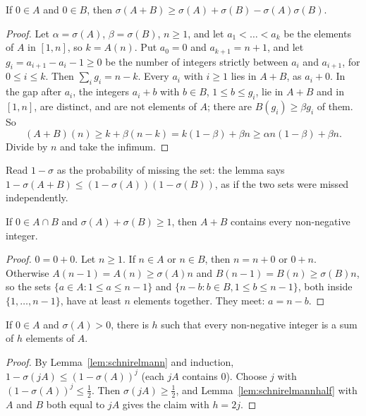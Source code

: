 \begin{lemma}\label{lem:schnirelmann}
If $0\in A$ and $0\in B$, then $\sigma(A+B)\ge\sigma(A)+\sigma(B)-\sigma(A)\sigma(B)$.
\end{lemma}
\begin{proof}
Let $\alpha=\sigma(A)$, $\beta=\sigma(B)$, $n\ge1$, and let $a_1<\dots<a_k$ be the elements of $A$ in $[1,n]$, so $k=A(n)$. Put $a_0=0$ and $a_{k+1}=n+1$, and let $g_i=a_{i+1}-a_i-1\ge0$ be the number of integers strictly between $a_i$ and $a_{i+1}$, for $0\le i\le k$. Then $\sum_ig_i=n-k$. Every $a_i$ with $i\ge1$ lies in $A+B$, as $a_i+0$. In the gap after $a_i$, the integers $a_i+b$ with $b\in B$, $1\le b\le g_i$, lie in $A+B$ and in $[1,n]$, are distinct, and are not elements of $A$; there are $B(g_i)\ge\beta g_i$ of them. So
\[
(A+B)(n)\ge k+\beta(n-k)=k(1-\beta)+\beta n\ge\alpha n(1-\beta)+\beta n.
\]
Divide by $n$ and take the infimum.
\end{proof}

Read $1-\sigma$ as the probability of missing the set: the lemma says $1-\sigma(A+B)\le(1-\sigma(A))(1-\sigma(B))$, as if the two sets were missed independently.

\begin{lemma}\label{lem:schnirelmannhalf}
If $0\in A\cap B$ and $\sigma(A)+\sigma(B)\ge1$, then $A+B$ contains every non-negative integer.
\end{lemma}
\begin{proof}
$0=0+0$. Let $n\ge1$. If $n\in A$ or $n\in B$, then $n=n+0$ or $0+n$. Otherwise $A(n-1)=A(n)\ge\sigma(A)n$ and $B(n-1)=B(n)\ge\sigma(B)n$, so the sets $\{a\in A:1\le a\le n-1\}$ and $\{n-b:b\in B,1\le b\le n-1\}$, both inside $\{1,\dots,n-1\}$, have at least $n$ elements together. They meet: $a=n-b$.
\end{proof}

\begin{theorem}[Schnirelmann, 1930]\label{thm:schnirelmannbasis}
If $0\in A$ and $\sigma(A)>0$, there is $h$ such that every non-negative integer is a sum of $h$ elements of $A$.
\end{theorem}
\begin{proof}
By Lemma~\ref{lem:schnirelmann} and induction, $1-\sigma(jA)\le(1-\sigma(A))^j$ (each $jA$ contains $0$). Choose $j$ with $(1-\sigma(A))^j\le\frac12$. Then $\sigma(jA)\ge\frac12$, and Lemma~\ref{lem:schnirelmannhalf} with $A$ and $B$ both equal to $jA$ gives the claim with $h=2j$.
\end{proof}


